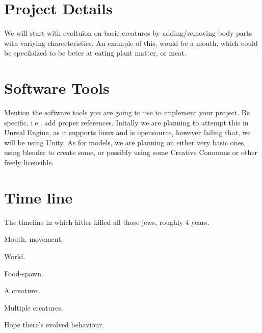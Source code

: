 \documentclass[runningheads]{llncs}
\begin{document}
\section{Project Details}
We will start with evoltuion on basic creatures by adding/removing body parts with variying charecteristics. An example of this, would be a mouth, which could be specilaized to be beter at eating plant matter, or meat.

\section{Software Tools}
Mention the software tools you are going to use to implement your project. Be specific, i.e., add proper references.
Initally we are planning to attempt this in Unreal Engine, as it supports linux and is opensource, however failing that, we will be using Unity.
As for models, we are planning on either very basic ones, using blender to create some, or possibly using some Creative Commons or other freely licensible.

\section{Time line}
The timeline in which hitler killed all those jews, roughly 4 years.
\begin{enumeration}
\item Mouth, movement.
\item World.
\item Food-spawn.
\item A creature.
\item Multiple creatures.
\item Hope there's evolved behaviour.
\end{enumeration}





\end{document}
